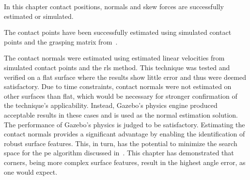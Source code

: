 In this chapter contact positions, normals and skew forces are successfully estimated or simulated. \medskip


The contact points have been successfully estimated using simulated contact points and the grasping matrix from~\cite{ruppel-philipp-biotac-gazebo-plugin}. \medskip


The contact normals were estimated using estimated linear velocities from simulated contact points and the \gls{rls} method. This technique was tested and verified on a flat surface where the results show little error and thus were deemed satisfactory. Due to time constraints, contact normals were not estimated on other surfaces than flat, which would be necessary for stronger confirmation of the technique's applicability. Instead, Gazebo's physics engine produced acceptable results in these cases and is used as the normal estimation solution. The performance of Gazebo's physics is judged to be satisfactory. Estimating the contact normals provides a significant advantage by enabling the identification of robust surface features. This, in turn, has the potential to minimize the search space for the \gls{pe} algorithm discussed in~. This chapter has demonstrated that corners, being more complex surface features, result in the highest angle error, as one would expect.\medskip


